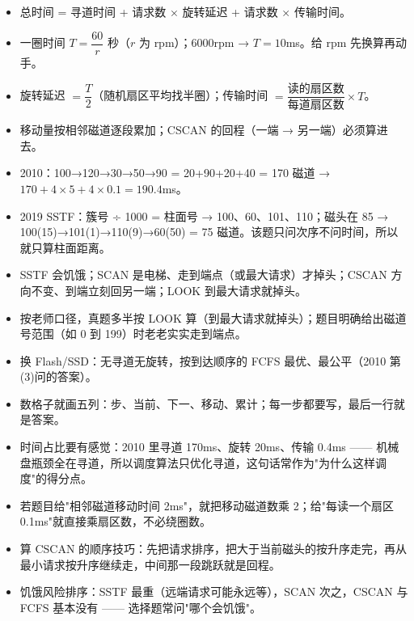 \documentclass[10pt,a4paper]{ctexart}
\begin{document}
\begin{itemize}

\item 总时间 = 寻道时间 + 请求数 × 旋转延迟 + 请求数 × 传输时间。

\item 一圈时间 $T=\dfrac{60}{r}$ 秒（$r$ 为 rpm）；6000rpm → $T=10$ms。给 rpm 先换算再动手。

\item 旋转延迟 $=\dfrac{T}{2}$（随机扇区平均找半圈）；传输时间 $=\dfrac{\text{读的扇区数}}{\text{每道扇区数}}\times T$。

\item 移动量按相邻磁道逐段累加；CSCAN 的回程（一端 → 另一端）必须算进去。

\item 2010：100→120→30→50→90 = 20+90+20+40 = 170 磁道 → $170+4\times5+4\times0.1=190.4$ms。

\item 2019 SSTF：簇号 ÷ 1000 = 柱面号 → 100、60、101、110；磁头在 85 → 100(15)→101(1)→110(9)→60(50) = 75 磁道。该题只问次序不问时间，所以就只算柱面距离。

\item SSTF 会饥饿；SCAN 是电梯、走到端点（或最大请求）才掉头；CSCAN 方向不变、到端立刻回另一端；LOOK 到最大请求就掉头。

\item 按老师口径，真题多半按 LOOK 算（到最大请求就掉头）；题目明确给出磁道号范围（如 0 到 199）时老老实实走到端点。

\item 换 Flash/SSD：无寻道无旋转，按到达顺序的 FCFS 最优、最公平（2010 第(3)问的答案）。

\item 数格子就画五列：步、当前、下一、移动、累计；每一步都要写，最后一行就是答案。

\item 时间占比要有感觉：2010 里寻道 170ms、旋转 20ms、传输 0.4ms —— 机械盘瓶颈全在寻道，所以调度算法只优化寻道，这句话常作为"为什么这样调度"的得分点。

\item 若题目给"相邻磁道移动时间 2ms"，就把移动磁道数乘 2；给"每读一个扇区 0.1ms"就直接乘扇区数，不必绕圈数。

\item 算 CSCAN 的顺序技巧：先把请求排序，把大于当前磁头的按升序走完，再从最小请求按升序继续走，中间那一段跳跃就是回程。

\item 饥饿风险排序：SSTF 最重（远端请求可能永远等），SCAN 次之，CSCAN 与 FCFS 基本没有 —— 选择题常问"哪个会饥饿"。

\end{itemize}
\end{document}
